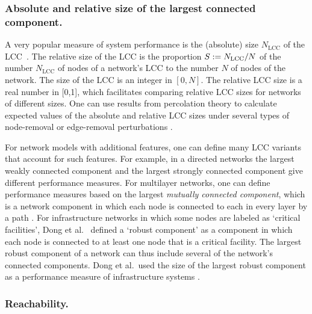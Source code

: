 \documentclass{comnet-mod}
\begin{document}
\subsubsection{Absolute and relative size of the largest connected component.}\label{sec:LCC}

A very popular measure of system performance is the (absolute) size $N_{\textrm{LCC}}$ of the LCC~\cite{Albert2000, Cohen2000, Holme2002, Shargel2003, Barrett2004, Bollobas2004, Motter2004, Paul2004, Tanizawa2005, Wang2006, Sole2008, Chaverri2010, Cohen2010, Herrmann2011, Nair2011, Zeng2012, Louzada2013, Sha2013, Lordan2014, Wang2014, Wang2014a, Gao2015, Nie2015, Wang2015, Agreste2016, Sun2017, Deng2019, Yamashita2019, Rosas-Casals2007}. The relative size of the LCC is the proportion $S := N_{\textrm{LCC}}/N$ of the number $N_\textrm{LCC}$ of nodes of a network's LCC to the number $N$ of nodes of the network.
The size of the LCC is an integer in $[0,N]$. The relative LCC size is a real number in [0,1], which facilitates comparing relative LCC sizes for networks of different sizes. One can use results from percolation theory \cite{Kesten1982, Sahini1994, Stauffer2018} to calculate expected values of the absolute and relative LCC sizes under several types of node-removal or edge-removal perturbations \cite{Cohen2000, Boguna2005, Cohen2010, Sahimi2023}.

For network models with additional features, one can define many LCC variants that account for such features. For example, in a directed networks the largest weakly connected component and the largest strongly connected component give different performance measures. For multilayer networks, one can define performance measures based on the largest \textit{mutually connected component}, which is a network component in which each node is connected to each in every layer by a path \cite{Cellai2013}. For infrastructure networks in which some nodes are labeled as `critical facilities', Dong et al.~\cite{Dong2019} defined a `robust component' as a component in which each node is connected to at least one node that is a critical facility. The largest robust component of a network can thus include several of the network's connected components. Dong et al.~used the size of the largest robust component as a performance measure of infrastructure systems \cite{Dong2019}.


\subsubsection{Reachability.} 
\end{document}
